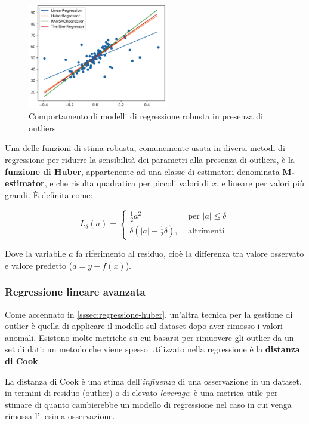 \begin{figure}[H]
\centering
\includegraphics[width=0.55\textwidth,height=\textheight,keepaspectratio]{img/robust.png}
\caption{Comportamento di modelli di regressione robusta in presenza di outliers}
\label{fig:reg_rob}
\end{figure}

Una delle funzioni di stima robusta, comunemente usata in diversi metodi di regressione per ridurre la sensibilità dei parametri alla presenza di outliers, è la \textbf{funzione di Huber}, appartenente ad una classe di estimatori denominata \textbf{M-estimator}, e che risulta quadratica per piccoli valori di $x$, e lineare per valori più grandi. È definita come:

$$L_{\delta}(a)= \begin{cases}\frac{1}{2} a^{2} & \text { per }|a| \leq \delta \\ \delta\left(|a|-\frac{1}{2} \delta\right), & \text { altrimenti }\end{cases}$$\smallskip

Dove la variabile $a$ fa riferimento al residuo, cioè la differenza tra valore osservato e valore predetto ($a = y - f(x)$).


\subsubsection{Regressione lineare avanzata}\label{sssec:regressione-cook}
Come accennato in \ref{sssec:regressione-huber}, un'altra tecnica per la gestione di outlier è quella di applicare il modello sul dataset dopo aver rimosso i valori anomali. Esistono molte metriche su cui basarsi per rimuovere gli outlier da un set di dati: un metodo che viene spesso utilizzato \cite{cook_ref} nella regressione è la \textbf{distanza di Cook}.

La distanza di Cook è una stima dell'\textit{influenza} di una osservazione in un dataset, in termini di residuo (outlier) o di elevato \textit{leverage}: è una metrica utile per stimare di quanto cambierebbe un modello di regressione nel caso in cui venga rimossa l'i-esima osservazione.

